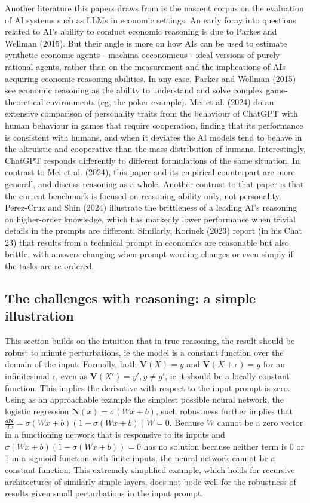 \documentclass[
]{article}
\begin{document}
Another literature this papers draws from is the nascent corpus on the
evaluation of AI systems such as LLMs in economic settings. An early
foray into questions related to AI's ability to conduct economic
reasoning is due to Parkes and Wellman (2015). But their angle is more
on how AIs can be used to estimate synthetic economic agents - machina
oeconomicus - ideal versions of purely rational agents, rather than on
the measurement and the implications of AIs acquiring economic reasoning
abilities. In any case, Parkes and Wellman (2015) see economic reasoning
as the ability to understand and solve complex game-theoretical
environments (eg, the poker example). Mei et al. (2024) do an extensive
comparison of personality traits from the behaviour of ChatGPT with
human behaviour in games that require cooperation, finding that its
performance is consistent with humans, and when it deviates the AI
models tend to behave in the altruistic and cooperative than the mass
distribution of humans. Interestingly, ChatGPT responds differently to
different formulations of the same situation. In contrast to Mei et al.
(2024), this paper and its empirical counterpart are more generall, and
discuss reasoning as a whole. Another contrast to that paper is that the
current benchmark is focused on reasoning ability only, not personality.
Perez-Cruz and Shin (2024) illustrate the brittleness of a leading AI's
reasoning on higher-order knowledge, which has markedly lower
performance when trivial details in the prompts are different.
Similarly, Korinek (2023) report (in his Chat 23) that results from a
technical prompt in economics are reasonable but also brittle, with
answers changing when prompt wording changes or even simply if the tasks
are re-ordered.

\subsection{The challenges with reasoning: a simple
illustration}\label{the-challenges-with-reasoning-a-simple-illustration}

This section builds on the intuition that in true reasoning, the result
should be robust to minute perturbations, ie the model is a constant
function over the domain of the input. Formally, both
\(\mathbf{V}(X) = y\) and \(\mathbf{V}(X + \epsilon) = y\) for an
infinitesimal \(\epsilon\), even as \(\mathbf{V}(X') = y', y \neq y'\),
ie it should be a locally constant function. This implies the derivative
with respect to the input prompt is zero. Using as an approachable
example the simplest possible neural network, the logistic regression
\(\mathbf{N}(x) = \sigma(Wx + b)\), such robustness further implies that
\(\frac{d\mathbf{N}}{d x} = \sigma(Wx + b)(1-\sigma(Wx + b))W = 0\).
Because \(W\) cannot be a zero vector in a functioning network that is
responsive to its inputs and \(\sigma(Wx + b)(1-\sigma(Wx + b)) = 0\)
has no solution because neither term is 0 or 1 in a sigmoid function
with finite inputs, the neural network cannot be a constant function.
This extremely simplified example, which holds for recursive
architectures of similarly simple layers, does not bode well for the
robustness of results given small perturbations in the input prompt.
\end{document}
